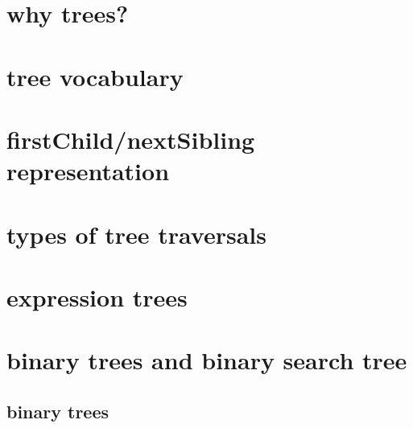 \newcommand{\nred}[1]{{\color{red!60!black}\bfseries #1}}
\newcommand{\nblack}[1]{\textbf{#1}}


\begin{frame}
    \titlepage
\end{frame}

%

\section{why trees?}


\section{tree vocabulary}



\section{firstChild/nextSibling representation}


\section{types of tree traversals}


\section{expression trees}


\section{binary trees and binary search tree}
\subsection{binary trees}


